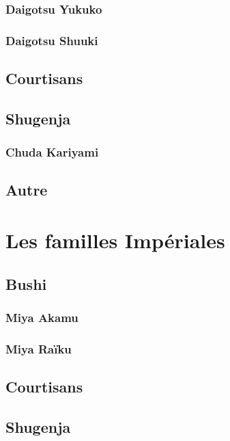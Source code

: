 \documentclass[10pt,a4paper]{book}
\begin{document}
\subsection{Daigotsu Yukuko}
\subsection{Daigotsu Shuuki}

\section{Courtisans}

\section{Shugenja}

\subsection{Chuda Kariyami}

\section{Autre}


\chapter{Les familles Impériales}

\section{Bushi}

\subsection{Miya Akamu}

\subsection{Miya Raïku}

\section{Courtisans}

\section{Shugenja}
\end{document}
